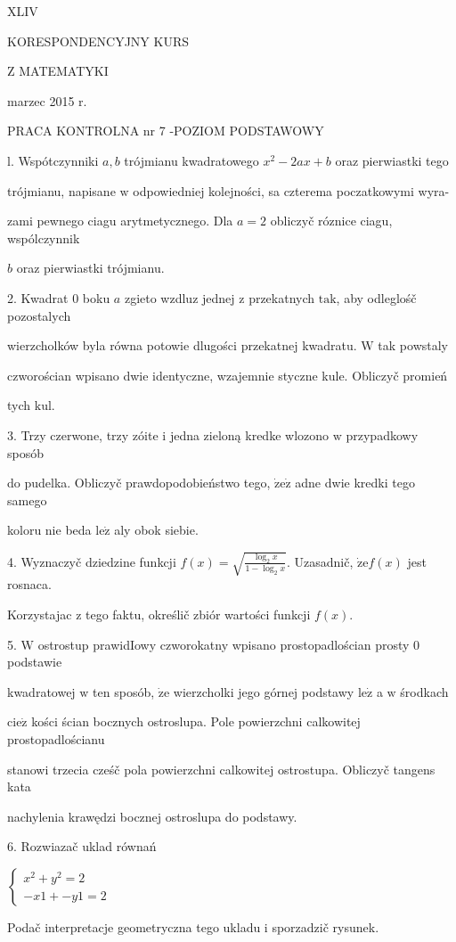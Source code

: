 \documentclass[a4paper,12pt]{article}
\begin{document}
XLIV

KORESPONDENCYJNY KURS

Z MATEMATYKI

marzec 2015 r.

PRACA KONTROLNA nr 7 -POZIOM PODSTAWOWY

l. Wspótczynniki $a, b$ trójmianu kwadratowego $x^{2} -2ax+b$ oraz pierwiastki tego

trójmianu, napisane $\mathrm{w}$ odpowiedniej kolejności, sa czterema poczatkowymi wyra-

zami pewnego ciagu arytmetycznego. Dla $a=2$ obliczyč róznice ciagu, wspólczynnik

$b$ oraz pierwiastki trójmianu.

2. Kwadrat $0$ boku $a$ zgieto wzdluz jednej $\mathrm{z}$ przekatnych $\mathrm{t}\mathrm{a}\mathrm{k}$, aby odleglośč pozostalych

wierzcholków byla równa potowie dlugości przekatnej kwadratu. $\mathrm{W}$ tak powstaly

czworościan wpisano dwie identyczne, wzajemnie styczne kule. Obliczyč promień

tych $\mathrm{k}\mathrm{u}\mathrm{l}.$

3. Trzy czerwone, trzy zóite $\mathrm{i}$ jedna zieloną kredke wlozono $\mathrm{w}$ przypadkowy sposób

do pudelka. Obliczyč prawdopodobieństwo tego, $\dot{\mathrm{z}}\mathrm{e}\dot{\mathrm{z}}$ adne dwie kredki tego samego

koloru nie beda $\mathrm{l}\mathrm{e}\dot{\mathrm{z}}$ aly obok siebie.

4. Wyznaczyč dziedzine funkcji $f(x)=\sqrt{\frac{\log_{2}x}{1-\log_{2}x}}$. Uzasadnič, $\dot{\mathrm{z}}\mathrm{e}f(x)$ jest rosnaca.

Korzystajac $\mathrm{z}$ tego faktu, określič zbiór wartości funkcji $f(x).$

5. $\mathrm{W}$ ostrostup prawidIowy czworokatny wpisano prostopadlościan prosty $0$ podstawie

kwadratowej $\mathrm{w}$ ten sposób, $\dot{\mathrm{z}}\mathrm{e}$ wierzcholki jego górnej podstawy $\mathrm{l}\mathrm{e}\dot{\mathrm{z}}$ a $\mathrm{w}$ środkach

$\mathrm{c}\mathrm{i}\mathrm{e}\dot{\mathrm{z}}$ kości ścian bocznych ostroslupa. Pole powierzchni calkowitej prostopadlościanu

stanowi trzecia cześč pola powierzchni calkowitej ostrostupa. Obliczyč tangens kata

nachylenia krawędzi bocznej ostroslupa do podstawy.

6. Rozwiazač uklad równań

$\left\{\begin{array}{l}
x^{2}+y^{2}=2\\
- x1+-y1=2
\end{array}\right.$

Podač interpretacje geometryczna tego ukladu i sporzadzič rysunek.
\end{document}
